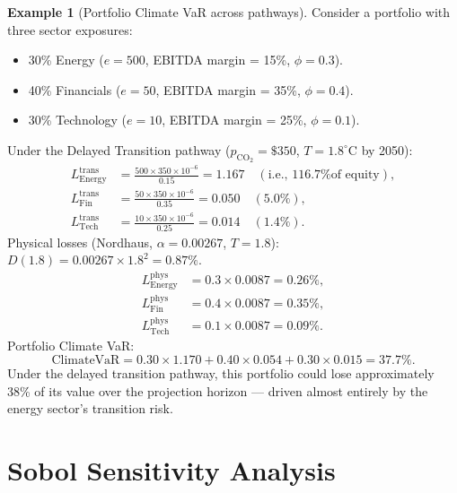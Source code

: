\documentclass[11pt, a4paper]{article}
\theoremstyle{definition}
\newtheorem{example}{Example}[section]
\theoremstyle{plain}
\theoremstyle{remark}
\begin{document}
\begin{example}[Portfolio Climate VaR across pathways]\label{ex:climate-var}
Consider a portfolio with three sector exposures:
\begin{itemize}
    \item 30\% Energy ($e = 500$, EBITDA margin = 15\%, $\phi = 0.3$).
    \item 40\% Financials ($e = 50$, EBITDA margin = 35\%, $\phi = 0.4$).
    \item 30\% Technology ($e = 10$, EBITDA margin = 25\%, $\phi = 0.1$).
\end{itemize}

Under the Delayed Transition pathway ($p_{\text{CO}_2} = \$350$, $T = 1.8^\circ$C
by 2050):
\begin{align}
    L_{\text{Energy}}^{\text{trans}} &= \frac{500 \times 350 \times 10^{-6}}{0.15}
    = 1.167 \quad (\text{i.e., 116.7\% of equity}), \\
    L_{\text{Fin}}^{\text{trans}} &= \frac{50 \times 350 \times 10^{-6}}{0.35}
    = 0.050 \quad (5.0\%), \\
    L_{\text{Tech}}^{\text{trans}} &= \frac{10 \times 350 \times 10^{-6}}{0.25}
    = 0.014 \quad (1.4\%).
\end{align}
Physical losses (Nordhaus, $\alpha = 0.00267$, $T = 1.8$):
$D(1.8) = 0.00267 \times 1.8^2 = 0.87\%$.
\begin{align}
    L_{\text{Energy}}^{\text{phys}} &= 0.3 \times 0.0087 = 0.26\%, \\
    L_{\text{Fin}}^{\text{phys}} &= 0.4 \times 0.0087 = 0.35\%, \\
    L_{\text{Tech}}^{\text{phys}} &= 0.1 \times 0.0087 = 0.09\%.
\end{align}
Portfolio Climate VaR:
\begin{equation}
    \text{ClimateVaR} = 0.30 \times 1.170 + 0.40 \times 0.054 + 0.30 \times 0.015
    = 37.7\%.
\end{equation}
Under the delayed transition pathway, this portfolio could lose approximately
38\% of its value over the projection horizon --- driven almost entirely by the
energy sector's transition risk.
\end{example}


\section{Sobol Sensitivity Analysis}
\label{sec:sobol}
\end{document}
